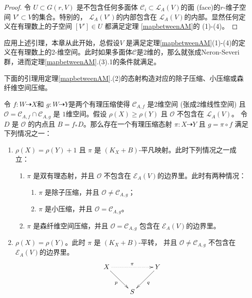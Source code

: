 \begin{proof}
  令 $U \subset G(r, V) $ 是不包含任何多面体 $\mathcal{C}_{i} \subset \mathcal{L}_{A}(V)$的面 (face)的$r$-维子空间  $V' \subset V$的集合。特别的，  $\mathcal{L}_{A}(V')$的内部包含在 $\mathcal{L}_{A}(V)$的内部。显然任何定义在有理数上的子空间 $[V']\in U$ 都满足定理 \ref{mapbetweenAM}的 (1)-(4)。
\end{proof}
\begin{remark}
  应用上述引理，本章从此开始，总假设$V$ 是满足定理\ref{mapbetweenAM}(1)-(4)的定义在有理数上的2-维空间。此时如果多面体$\mathcal{C}$是2维的，那么就张成Neron-Severi群，进而定理\ref{mapbetweenAM}.(3).1的条件就满足。
\end{remark}


下面的引理用定理\ref{mapbetweenAM}.(2)的态射构造对应的除子压缩、小压缩或森纤维空间压缩。 
\begin{lemma}\label{mapbetweenAM2}
  \cite[Lemma 3.5]{haconSarkisovProgram2012} 令 $ f:W\dashrightarrow X $和 $ g:W\dashrightarrow  Y $是两个有理压缩使得 $ \mathcal{C}_{A,f} $ 是2维空间 (张成2维线性空间) 且 $ \mathcal{O}=\mathcal{C}_{A,f}\cap \mathcal{C}_{A,g} $ 是 $ 1 $维空间。假设 $ \rho(X)\geqslant \rho(Y) $ 且 $ \mathcal{O} $ 不包含在 $ \mathcal{L}_{A}(V) $。 令 $ D $ 是 $ \mathcal{O} $ 的内点且 $ B=f_*D $。那么存在一个有理压缩态射 $ \pi:X\dashrightarrow Y $ 且 $ g=\pi\circ f $ 满足下列情况之一：
  \begin{enumerate}
    \item $ \rho(X)=\rho(Y)+1 $ 且 $ \pi  $ 是 $ (K_X+B) $-平凡映射。此时下列情况之一成立：
          \begin{enumerate}
            \item $ \pi $ 是双有理态射，并且 $ \mathcal{O} $ 不包含在 $ \mathcal{E}_A(V) $的边界里。此时有两种情况：
                  \begin{enumerate}
                    \item $ \pi $ 是除子压缩，并且 $ \mathcal{O}\neq \mathcal{C}_{A,g} $；
                    \item $ \pi $ 是小压缩，并且 $ \mathcal{O}= \mathcal{C}_{A,g} $。
                  \end{enumerate}
            \item $ \pi $ 是森纤维空间压缩，并且 $ \mathcal{O}=\mathcal{C}_{A,g} $ 包含在 $ \mathcal{E}_{A}(V) $的边界里。
          \end{enumerate}
    \item $ \rho(X)=\rho(Y) $。此时  $ \pi $ 是 $ (K_X+B) $-平转， 并且 $ \mathcal{O}\neq\mathcal{C}_{A,g} $ 不包含在 $ \mathcal{E}_A(V) $的边界里。
      \[ \xymatrix{
          X\ar[rd]_{p} \ar@{.>}[rr]^{\pi} & & Y\ar[ld]^{q} \\
        & S &
        } \]
  \end{enumerate}
\end{lemma}
